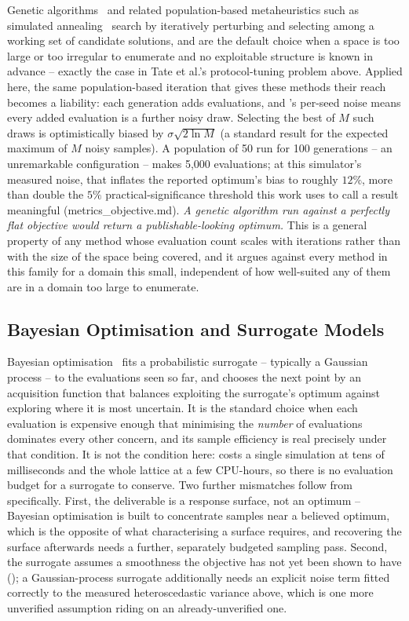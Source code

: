 \documentclass{article}
\begin{document}
Genetic algorithms~\cite{Gordon93serialand, WHITELY93} and related
population-based metaheuristics such as simulated
annealing~\cite{kirkpatrick83optimization} search by iteratively
perturbing and selecting among a working set of candidate solutions, and are
the default choice when a space is too large or too irregular to enumerate and
no exploitable structure is known in advance -- exactly the case in
Tate et al.'s protocol-tuning problem above. Applied here, the same
population-based iteration that gives these methods their reach becomes a
liability: each generation adds evaluations, and 's
per-seed noise means every added evaluation is a further noisy draw. Selecting
the best of $M$ such draws is optimistically biased by
$\sigma \sqrt{2 \ln M}$ (a standard result for the expected maximum of
$M$ noisy samples). A population of 50 run for 100 generations -- an
unremarkable configuration -- makes 5{,}000 evaluations; at this simulator's
measured noise, that inflates the reported optimum's bias to roughly
$12\%$, more than double the $5\%$ practical-significance threshold this work
uses to call a result meaningful (metrics\_objective.md). \emph{A genetic
algorithm run against a perfectly flat objective would return a
publishable-looking optimum.} This is a general property of any method whose
evaluation count scales with iterations rather than with the size of the space
being covered, and it argues against every method in this family for a
domain this small, independent of how well-suited any of them are in a
domain too large to enumerate.

\subsection{Bayesian Optimisation and Surrogate Models}

Bayesian optimisation~\cite{jones1998efficient, shahriari2016taking} fits a
probabilistic surrogate -- typically a Gaussian process -- to the evaluations
seen so far, and chooses the next point by an acquisition function that
balances exploiting the surrogate's optimum against exploring where it is most
uncertain. It is the standard choice when each evaluation is expensive enough
that minimising the \emph{number} of evaluations dominates every other
concern, and its sample efficiency is real precisely under that condition. It
is not the condition here:  costs a single simulation at
tens of milliseconds and the whole lattice at a few CPU-hours, so there is no
evaluation budget for a surrogate to conserve. Two further mismatches follow
from  specifically. First, the deliverable is a response
surface, not an optimum -- Bayesian optimisation is built to concentrate
samples near a believed optimum, which is the opposite of what characterising
a surface requires, and recovering the surface afterwards needs a further,
separately budgeted sampling pass. Second, the surrogate assumes a smoothness
the objective has not yet been shown to have (); a
Gaussian-process surrogate additionally needs an explicit noise term fitted
correctly to the measured heteroscedastic variance above, which is one more
unverified assumption riding on an already-unverified one.
\end{document}
